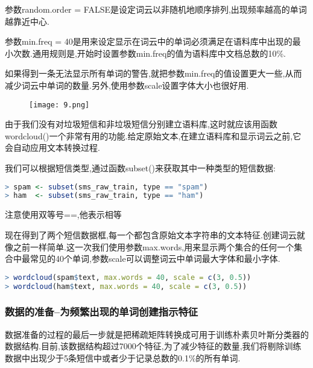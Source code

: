 \documentclass[11pt,a4paper,oneside]{book}
\begin{document}
参数random.order = FALSE是设定词云以非随机地顺序排列,出现频率越高的单词越靠近中心.

参数min.freq = 40是用来设定显示在词云中的单词必须满足在语料库中出现的最小次数.通用规则是,开始时设置参数min.freq的值为语料库中文档总数的10\%.
\begin{tcolorbox}[colback=pink!10!white,colframe=pink!100!black]
如果得到一条无法显示所有单词的警告,就把参数min.freq的值设置更大一些,从而减少词云中单词的数量.另外,使用参数scale设置字体大小也很好用.
\end{tcolorbox}
\begin{figure}[H]
	\centering
	\texttt{[image: 9.png]}
\end{figure}
由于我们没有对垃圾短信和非垃圾短信分别建立语料库,这时就应该用函数wordcloud()一个非常有用的功能.给定原始文本,在建立语料库和显示词云之前,它会自动应用文本转换过程.

我们可以根据短信类型,通过函数subset()来获取其中一种类型的短信数据:
\begin{lstlisting}[language=r]
> spam <- subset(sms_raw_train, type == "spam")
> ham  <- subset(sms_raw_train, type == "ham")
\end{lstlisting}

\begin{tcolorbox}[colback=pink!10!white,colframe=pink!100!black]
注意使用双等号==,他表示相等
\end{tcolorbox}
现在得到了两个短信数据框,每一个都包含原始文本字符串的文本特征.创建词云就像之前一样简单.这一次我们使用参数max.words,用来显示两个集合的任何一个集合中最常见的40个单词,参数scale可以调整词云中单词最大字体和最小字体.
\begin{lstlisting}[language=r]
> wordcloud(spam$text, max.words = 40, scale = c(3, 0.5))
> wordcloud(ham$text, max.words = 40, scale = c(3, 0.5))
\end{lstlisting}
\begin{figure}[H]
	\centering
\end{figure}
\subsubsection{数据的准备--为频繁出现的单词创建指示特征}
数据准备的过程的最后一步就是把稀疏矩阵转换成可用于训练朴素贝叶斯分类器的数据结构.目前,该数据结构超过7000个特征,为了减少特征的数量,我们将剔除训练数据中出现少于5条短信中或者少于记录总数的0.1\%的所有单词.
\end{document}
